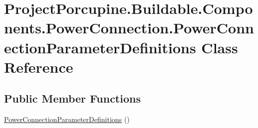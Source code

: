 \hypertarget{class_project_porcupine_1_1_buildable_1_1_components_1_1_power_connection_1_1_power_connection_parameter_definitions}{}\section{Project\+Porcupine.\+Buildable.\+Components.\+Power\+Connection.\+Power\+Connection\+Parameter\+Definitions Class Reference}
\label{class_project_porcupine_1_1_buildable_1_1_components_1_1_power_connection_1_1_power_connection_parameter_definitions}
\subsection*{Public Member Functions}
\begin{DoxyCompactItemize}
\item 
\hyperlink{class_project_porcupine_1_1_buildable_1_1_components_1_1_power_connection_1_1_power_connection_parameter_definitions_a628efdc76d299cf19ae1375d5f54136c}{Power\+Connection\+Parameter\+Definitions} ()
\end{DoxyCompactItemize}
